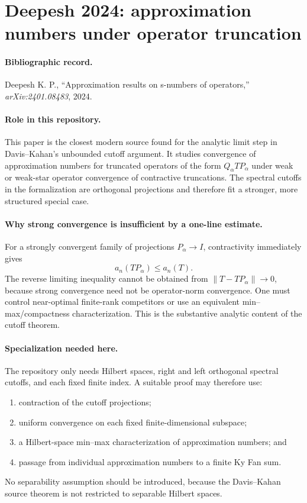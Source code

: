 \section{Deepesh 2024: approximation numbers under operator truncation}
\label{sec:deepesh-2024-approximation-truncations}

\paragraph{Bibliographic record.}
Deepesh K. P., ``Approximation results on s-numbers of operators,''
\emph{arXiv:2401.08483}, 2024.

\paragraph{Role in this repository.}
This paper is the closest modern source found for the analytic limit step in
Davis--Kahan's unbounded cutoff argument.  It studies convergence of
approximation numbers for truncated operators of the form $Q_\alpha T P_\alpha$
under weak or weak-star operator convergence of contractive truncations.  The
spectral cutoffs in the formalization are orthogonal projections and therefore
fit a stronger, more structured special case.

\paragraph{Why strong convergence is insufficient by a one-line estimate.}
For a strongly convergent family of projections $P_\alpha\to I$, contractivity
immediately gives
\[
  a_n(TP_\alpha)\le a_n(T).
\]
The reverse limiting inequality cannot be obtained from
$\lVert T-TP_\alpha\rVert\to0$, because strong convergence need not be
operator-norm convergence.  One must control near-optimal finite-rank
competitors or use an equivalent min--max/compactness characterization.  This
is the substantive analytic content of the cutoff theorem.

\paragraph{Specialization needed here.}
The repository only needs Hilbert spaces, right and left orthogonal spectral
cutoffs, and each fixed finite index.  A suitable proof may therefore use:
\begin{enumerate}
\item contraction of the cutoff projections;
\item uniform convergence on each fixed finite-dimensional subspace;
\item a Hilbert-space min--max characterization of approximation numbers; and
\item passage from individual approximation numbers to a finite Ky Fan sum.
\end{enumerate}
No separability assumption should be introduced, because the Davis--Kahan
source theorem is not restricted to separable Hilbert spaces.

